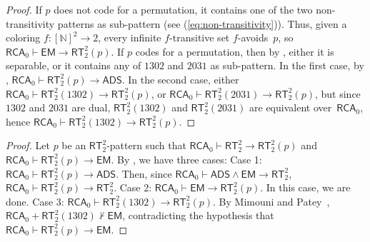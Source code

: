 \documentclass{article}
\numberwithin{theorem}{section}
\newtheorem{proposition}[theorem]{Proposition}
\newtheorem{corollary}[theorem]{Corollary}
\newcommand{\RCA}[0]{\mathsf{RCA}}
\newcommand{\ADS}[0]{\mathsf{ADS}}
\newcommand{\EM}[0]{\mathsf{EM}}
\newcommand{\RT}[0]{\mathsf{RT}}
\newcommand{\NN}[0]{\mathbb{N}}
\begin{document}
\begin{proof}
If $p$ does not code for a permutation, it contains one of the two non-transitivity patterns as sub-pattern (see (\ref{eq:non-transitivity})). Thus, given a coloring $f : [\NN]^2 \to 2$, every infinite $f$-transitive set $f$-avoids~$p$, so $\RCA_0 \vdash \EM \to \RT^2_2(p)$.
If $p$ codes for a permutation, then by , either it is separable, or it contains any of $1302$ and $2031$ as sub-pattern. In the first case, by , $\RCA_0 \vdash \RT^2_2(p) \to \ADS$. In the second case, either $\RCA_0 \vdash \RT^2_2(1302) \to \RT^2_2(p)$, or $\RCA_0 \vdash \RT^2_2(2031) \to \RT^2_2(p)$, but since $1302$ and $2031$ are dual, $\RT^2_2(1302)$ and $\RT^2_2(2031)$ are equivalent over~$\RCA_0$, hence $\RCA_0 \vdash \RT^2_2(1302) \to \RT^2_2(p)$.
\end{proof}

\begin{proof}
Let $p$ be an $\RT^2_2$-pattern such that $\RCA_0 \vdash \RT^2_2 \to \RT^2_2(p)$ and $\RCA_0 \vdash \RT^2_2(p) \to \EM$. By , we have three cases:
Case 1: $\RCA_0 \vdash \RT^2_2(p) \to \ADS$. Then, since $\RCA_0 \vdash \ADS \wedge \EM \to \RT^2_2$, $\RCA_0 \vdash \RT^2_2(p) \to \RT^2_2$.
Case 2: $\RCA_0 \vdash \EM \to \RT^2_2(p)$. In this case, we are done.
Case 3: $\RCA_0 \vdash \RT^2_2(1302) \to \RT^2_2(p)$. By Mimouni and Patey~\cite{mimouni2025ramseylike}, $\RCA_0 + \RT^2_2(1302) \nvdash \EM$, contradicting the hypothesis that $\RCA_0 \vdash \RT^2_2(p) \to \EM$.
\end{proof}
\end{document}
